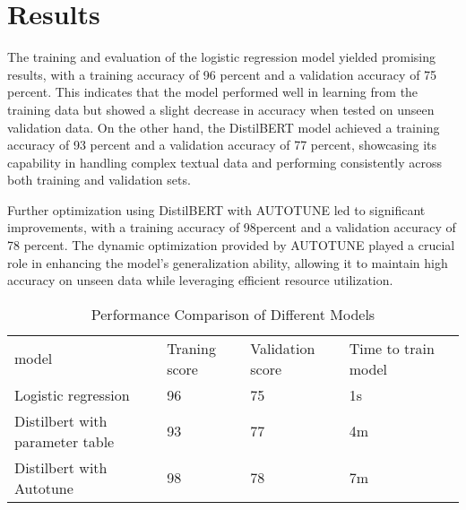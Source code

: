 \chapter{Results}

The training and evaluation of the logistic regression model yielded promising results, with a training accuracy of 96 percent and a validation accuracy of 75 percent. This indicates that the model performed well in learning from the training data but showed a slight decrease in accuracy when tested on unseen validation data. On the other hand, the DistilBERT model achieved a training accuracy of 93 percent and a validation accuracy of 77 percent, showcasing its capability in handling complex textual data and performing consistently across both training and validation sets.

Further optimization using DistilBERT with AUTOTUNE led to significant improvements, with a training accuracy of 98percent and a validation accuracy of 78 percent. The dynamic optimization provided by AUTOTUNE played a crucial role in enhancing the model's generalization ability, allowing it to maintain high accuracy on unseen data while leveraging efficient resource utilization.
\label{ch:results}
\begin{table}[ht]
\caption{Performance Comparison of Different Models}
\begin{tabular}{lllll}

model                           & Traning score & Validation score & Time to train model &  \\
Logistic regression             & 96            & 75               & 1s                  &  \\
Distilbert with parameter table & 93            & 77               & 4m                  &  \\
Distilbert with Autotune        & 98            & 78               & 7m                  & 
\end{tabular}
\end{table}
